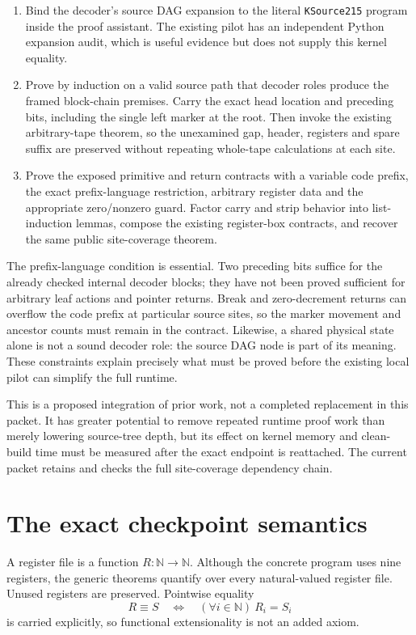 \documentclass[11pt,letterpaper]{article}
\theoremstyle{definition}\newtheorem{definition}[theorem]{Definition}
\newcommand{\N}{\mathbb N}
\begin{document}
\begin{enumerate}
\item Bind the decoder's source DAG expansion to the literal
\texttt{KSource215} program inside the proof assistant. The existing pilot
has an independent Python expansion audit, which is useful evidence but does
not supply this kernel equality.
\item Prove by induction on a valid source path that decoder roles produce
the framed block-chain premises. Carry the exact head location and preceding
bits, including the single left marker at the root. Then invoke the existing
arbitrary-tape theorem, so the unexamined gap, header, registers and spare
suffix are preserved without repeating whole-tape calculations at each site.
\item Prove the exposed primitive and return contracts with a variable code
prefix, the exact prefix-language restriction, arbitrary register data and
the appropriate zero/nonzero guard. Factor carry and strip behavior into
list-induction lemmas, compose the existing register-box contracts, and
recover the same public site-coverage theorem.
\end{enumerate}

The prefix-language condition is essential. Two preceding bits suffice for
the already checked internal decoder blocks; they have not been proved
sufficient for arbitrary leaf actions and pointer returns. Break and
zero-decrement returns can overflow the code prefix at particular source
sites, so the marker movement and ancestor counts must remain in the contract.
Likewise, a shared physical state alone is not a sound decoder role: the source
DAG node is part of its meaning. These constraints explain precisely what
must be proved before the existing local pilot can simplify the full runtime.

This is a proposed integration of prior work, not a completed replacement in
this packet. It has greater potential to remove repeated runtime proof work
than merely lowering source-tree depth, but its effect on kernel memory and
clean-build time must be measured after the exact endpoint is reattached.
The current packet retains and checks the full site-coverage dependency chain.

\section{The exact checkpoint semantics}

A register file is a function $R:\N\to\N$. Although the concrete program uses
nine registers, the generic theorems quantify over every natural-valued register
file. Unused registers are preserved. Pointwise equality
\[
 R\equiv S\quad\Longleftrightarrow\quad (\forall i\in\N)\ R_i=S_i
\]
is carried explicitly, so functional extensionality is not an added axiom.
\end{document}
